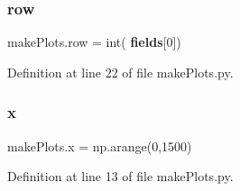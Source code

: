 \subsubsection{row}
{\footnotesize\ttfamily make\+Plots.\+row = int(\textbf{ fields}[0])}



Definition at line 22 of file make\+Plots.\+py.

\mbox{\label{namespacemake_plots_aa1905885c982d13393b4b869369091f3}} 
\subsubsection{x}
{\footnotesize\ttfamily make\+Plots.\+x = np.\+arange(0,1500)}



Definition at line 13 of file make\+Plots.\+py.

